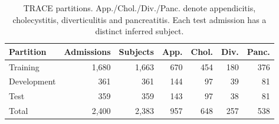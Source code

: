 \begin{table}[!tbp]\centering\footnotesize
\caption{TRACE partitions. App./Chol./Div./Panc. denote appendicitis, cholecystitis, diverticulitis and pancreatitis. Each test admission has a distinct inferred subject.}\label{tab:trace-partitions}
\begin{tabular}{lrrrrrr}\toprule
Partition & Admissions & Subjects & App. & Chol. & Div. & Panc.\\\midrule
Training & 1,680 & 1,663 & 670 & 454 & 180 & 376\\
Development & 361 & 361 & 144 & 97 & 39 & 81\\
Test & 359 & 359 & 143 & 97 & 38 & 81\\
Total & 2,400 & 2,383 & 957 & 648 & 257 & 538\\
\bottomrule\end{tabular}\end{table}

